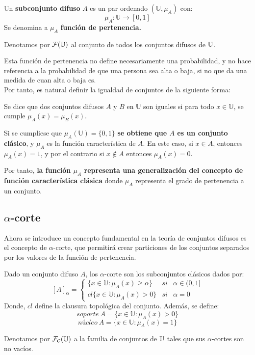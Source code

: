 \begin{definicion}
  \label{def:subconjunto_difuso}
  
  Un \textbf{subconjunto difuso} $A$ es un par ordenado $(\mathbb{U}, \mu_A)$ con:
  \[
  \mu_A : \mathbb{U} \longrightarrow [0,1]
  \]
  Se denomina a $\mu_A$ \textbf{función de pertenencia.}
\end{definicion}
Denotamos por $\mathcal{F}(\mathbb U)$ al conjunto de todos los conjuntos difusos de $\mathbb U$.

Esta función de pertenencia no define necesariamente una probabilidad, y no hace referencia a la probabilidad de que una persona sea alta o baja, si no que da una medida de cuan alta o baja es.\\ 

Por tanto, es natural definir la igualdad de conjuntos de la siguiente forma:

\begin{definicion}
  \label{def:igualdad}
  Se dice que dos conjuntos difusos $A$ y $B$ en $\mathbb{U}$ son iguales si para todo $x \in \mathbb{U}$, se cumple $\mu_A(x) = \mu_B(x)$.
\end{definicion}

Si se cumpliese que $\mu_A(\mathbb{U})=\{0, 1\}$ \textbf{se obtiene que $A$ es un conjunto clásico}, y $\mu_A$ es la función característica de $A$. En este caso, si $x \in A$, entonces $\mu_A(x)=1$, y por el contrario si $x \notin A$ entonces $\mu_A(x)=0$.

Por tanto, \textbf{la función $\mu_A$ representa una generalización del concepto de función característica clásica} donde $\mu_A$ representa el grado de pertenencia a un conjunto.

\subsection{$\alpha$-corte}
Ahora se introduce un concepto fundamental en la teoría de conjuntos difusos es el concepto de $\alpha$-corte, que permitirá crear particiones de los conjuntos separados por los valores de la función de pertenencia.
\begin{definicion}
  \label{def:alpha_corte}
  Dado un conjunto difuso $A$, los $\alpha$-corte son los subconjuntos clásicos dados por:
  \[
    [A]_\alpha = \left\{
    \begin{array}{ccc}
      \{x \in \mathbb{U} : \mu_A(x) \geq \alpha \} & si & \alpha \in (0, 1] \\
      cl\{x \in \mathbb{U} : \mu_A(x) > 0\} & si & \alpha=0
    \end{array}
    \right.
    \]
    Donde, $cl$ define la clausura topológica del conjunto. Además, se define:
    \[
    soporte ~ A = \{x \in \mathbb{U} : \mu_A(x) > 0 \}
    \]
    \[
    núcleo ~ A = \{x \in \mathbb{U} : \mu_A(x) = 1 \}
    \]
\end{definicion}
Denotamos por $\mathcal{F}_\mathcal{C}(\mathbb U)$ a la familia de conjuntos de $\mathbb U$ tales que sus $\alpha$-cortes son no vacíos.


